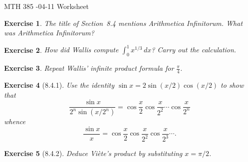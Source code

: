 \documentclass[12pt]{article}
\theoremstyle{plain}
\newtheorem{ex}{Exercise}
\begin{document}
MTH 385 -04-11 Worksheet

\begin{ex}
  The title of Section~8.4 mentions \emph{Arithmetica Infinitorum}. What was \emph{Arithmetica Infinitorum}?
\end{ex}

\begin{ex}
  How did Wallis compute $\int_0^1x^{1/3}\,dx$? Carry out the calculation.
\end{ex}

\begin{ex}
  Repeat Wallis' infinite product formula for $\frac{\pi}{4}$.
\end{ex}

\begin{ex} [8.4.1]
  Use the identity $\sin x=2\sin(x/2)\cos(x/2)$ to show that
  \[
    \frac{\sin x}{2^n\sin(x/2^n)}=\cos\frac{x}{2}\cos\frac{x}{2^2}\cdots\cos\frac{x}{2^n}
  \]
  whence
  \[
    \frac{\sin x}{x}=\cos\frac{x}{2}\cos\frac{x}{2^2}\cos\frac{x}{2^3}\cdots.
  \]
\end{ex}

\begin{ex} [8.4.2]
  Deduce Vi\`{e}te’s product by substituting $x=\pi/2$.
\end{ex}
\end{document}
